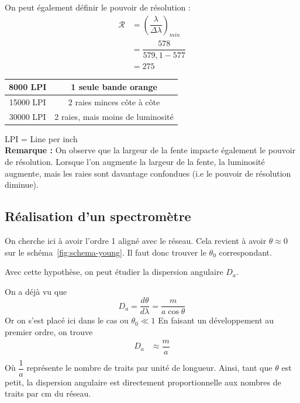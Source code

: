 \documentclass[12pt,a4paper]{article}
\begin{document}
	On peut également définir le pouvoir de résolution :
	\begin{align*}
	\mathcal{R} &=\left(\dfrac{\lambda}{\Delta\lambda}\right)_{min}\\[4pt]
	&=\dfrac{578}{579,1-577}\\
	&=275
	\end{align*}
	
	\begin{tabular}{|c|c|}
		\hline 
		8000 LPI & 1 seule bande orange \\ 
		\hline 
		15000 LPI & 2 raies minces côte à côte \\ 
		\hline 
		30000 LPI & 2 raies, mais moins de luminosité \\ 
		\hline 
	\end{tabular} 
	LPI = Line per inch\\
	
	\vspace*{+1em}
	\textbf{Remarque : } On observe que la largeur de la fente impacte également le pouvoir de résolution. Lorsque l'on augmente la largeur de la fente, la luminosité augmente, mais les raies sont davantage confondues (i.e le pouvoir de résolution diminue).\\
	
	\subsection{Réalisation d'un spectromètre}
	On cherche ici à avoir l'ordre 1 aligné avec le réseau. Cela revient à avoir $\theta\approx0$ sur le schéma~\ref{fig:schema-young}. Il faut donc trouver le $\theta_0$ correspondant.
	
	Avec cette hypothèse, on peut étudier la dispersion angulaire $D_a$.
	
	On a déjà vu que $$D_a=\dfrac{d\theta}{d\lambda}=\dfrac{m}{a\cos\theta}$$
	Or on s'est placé ici dans le cas ou $\theta_0\ll1$
	En faisant un développement au premier ordre, on trouve 
	\begin{align*}
	D_a &\approx\dfrac{m}{a}\\
	\end{align*}
	Où $\dfrac{1}{a}$ représente le nombre de traits par unité de longueur.
	Ainsi, tant que $\theta$ est petit, la dispersion angulaire est directement proportionnelle aux nombres de traits par cm du réseau.
\end{document}
